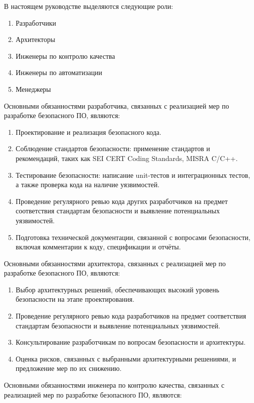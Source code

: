 В настоящем руководстве выделяются следующие роли:

\begin{enumerate}
    \item Разработчики
    \item Архитекторы
    \item Инженеры по контролю качества
    \item Инженеры по автоматизации
    \item Менеджеры
\end{enumerate}

Основными обязанностями разработчика, связанных с реализацией мер по разработке безопасного ПО, являются:

\begin{enumerate}
    \item Проектирование и реализация безопасного кода.
    \item Соблюдение стандартов безопасности: применение стандартов и рекомендаций, таких как SEI CERT Coding Standards, MISRA C/C++.
    \item Тестирование безопасности: написание unit-тестов и интеграционных тестов, а также проверка кода на наличие уязвимостей.
    \item Проведение регулярного ревью кода других разработчиков на предмет соответствия стандартам безопасности и выявление потенциальных уязвимостей.
    \item Подготовка технической документации, связанной с вопросами безопасности, включая комментарии к коду, спецификации и отчёты.
\end{enumerate}

Основными обязанностями архитектора, связанных с реализацией мер по разработке безопасного ПО, являются:

\begin{enumerate}
    \item Выбор архитектурных решений, обеспечивающих высокий уровень безопасности на этапе проектирования.
    \item Проведение регулярного ревью кода разработчиков на предмет соответствия стандартам безопасности и выявление потенциальных уязвимостей.
    \item Консультирование разработчикам по вопросам безопасности и архитектуры.
    \item Оценка рисков, связанных с выбранными архитектурными решениями, и предложение мер по их снижению.
\end{enumerate}

Основными обязанностями инженера по контролю качества, связанных с реализацией мер по разработке безопасного ПО, являются:

